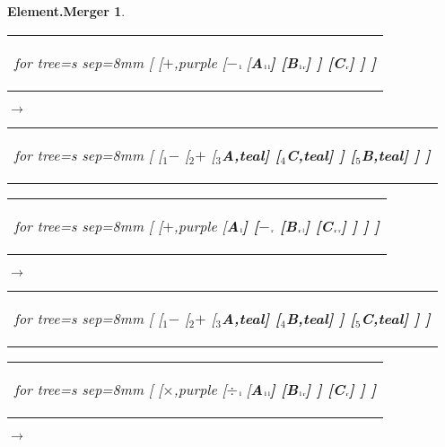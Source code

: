 \documentclass[UTF8,10pt]{ctexart}
\newcommand{\Bigskip}{\bigskip\medskip}
\newcommand{\subtreeA}{\bf A}
\newcommand{\subtreeB}{\bf B}
\newcommand{\subtreeC}{\bf C}
\newcommand{\I}{$_{\scriptscriptstyle 1}$}
\newcommand{\II}{$_{\scriptscriptstyle 2}$}
\newcommand{\III}{$_{\scriptscriptstyle 3}$}
\newcommand{\IV}{$_{\scriptscriptstyle 4}$}
\newcommand{\V}{$_{\scriptscriptstyle 5}$}
\newcommand{\lc}{$_{\:\!\scriptscriptstyle\rm l\!}$}
\newcommand{\rc}{$_{\:\!\scriptscriptstyle\rm r\!}$}
\newcommand{\Addition}{$+$}
\newcommand{\Subtraction}{$-$}
\newcommand{\Multiplication}{$\times$}
\newcommand{\Division}{$\div$}
\newtheorem*{Element.Merger}{\bf Element.Merger }
\begin{document}
	\begin{center}\vspace*{\fill}
		\begin{Element.Merger}
			\qquad\par\Bigskip
			\begin{tabular}{c}
				\begin{forest}
					for tree={s sep=8mm}
					[
						[\Addition,purple
							[\Subtraction\lc
								[\subtreeA\lc\lc]
								[\subtreeB\lc\rc]
							]
							[\subtreeC\rc]
						]
					]
				\end{forest}
			\end{tabular}
			\qquad
			$\longrightarrow$
			\qquad
			\begin{tabular}{c}
				\begin{forest}
					for tree={s sep=8mm}
					[
						[\I\Subtraction
							[\II\Addition
								[\III\subtreeA,teal]
								[\IV\subtreeC,teal]
							]
							[\V\subtreeB,teal]
						]
					]
				\end{forest}
			\end{tabular}
			\par\bigskip
			\begin{tabular}{c}
				\begin{forest}
					for tree={s sep=8mm}
					[
						[\Addition,purple
							[\subtreeA\lc]
							[\Subtraction\rc
								[\subtreeB\rc\lc]
								[\subtreeC\rc\rc]
							]
						]
					]
				\end{forest}
			\end{tabular}
			\qquad
			$\longrightarrow$
			\qquad
			\begin{tabular}{c}
				\begin{forest}
					for tree={s sep=8mm}
					[
						[\I\Subtraction
							[\II\Addition
								[\III\subtreeA,teal]
								[\IV\subtreeB,teal]
							]
							[\V\subtreeC,teal]
						]
					]
				\end{forest}
			\end{tabular}
			\par\bigskip
			\begin{tabular}{c}
				\begin{forest}
					for tree={s sep=8mm}
					[
						[\Multiplication,purple
							[\Division\lc
								[\subtreeA\lc\lc]
								[\subtreeB\lc\rc]
							]
							[\subtreeC\rc]
						]
					]
				\end{forest}
			\end{tabular}
			\qquad
			$\longrightarrow$
			\qquad
			\begin{tabular}{c}

\end{tabular}
\end{Element.Merger}
\end{center}
\end{document}
